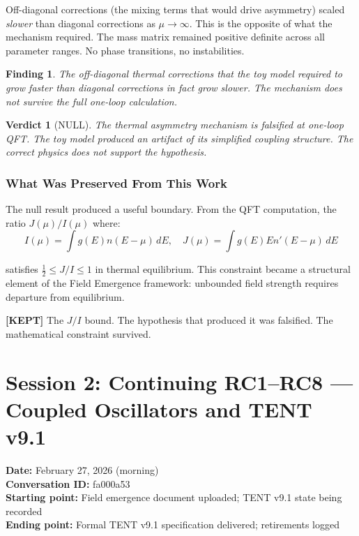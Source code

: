 \documentclass[11pt]{article}
\newtheorem{finding}{Finding}
\newtheorem{verdict}{Verdict}
\begin{document}
Off-diagonal corrections (the mixing terms that would drive asymmetry) scaled \textit{slower} than diagonal corrections as $\mu \to \infty$. This is the opposite of what the mechanism required. The mass matrix remained positive definite across all parameter ranges. No phase transitions, no instabilities.

\begin{finding}
The off-diagonal thermal corrections that the toy model required to grow faster than diagonal corrections in fact grow slower. The mechanism does not survive the full one-loop calculation.
\end{finding}

\begin{verdict}[\textcolor{nullred}{NULL}]
The thermal asymmetry mechanism is falsified at one-loop QFT. The toy model produced an artifact of its simplified coupling structure. The correct physics does not support the hypothesis.
\end{verdict}

\subsubsection{What Was Preserved From This Work}

The null result produced a useful boundary. From the QFT computation, the ratio $J(\mu)/I(\mu)$ where:
\begin{equation}
  I(\mu) = \int g(E) n(E - \mu)\, dE, \quad J(\mu) = \int g(E) E n'(E - \mu)\, dE
\end{equation}

satisfies $\frac{1}{2} \leq J/I \leq 1$ in thermal equilibrium. This constraint became a structural element of the Field Emergence framework: unbounded field strength requires departure from equilibrium.

\begin{graybox}
\textcolor{keepgreen}{\textbf{[KEPT]}} The $J/I$ bound. The hypothesis that produced it was falsified. The mathematical constraint survived.
\end{graybox}

\section{Session 2: Continuing RC1--RC8 --- Coupled Oscillators and TENT v9.1}
\label{sec:session2}

\textbf{Date:} February 27, 2026 (morning)\\
\textbf{Conversation ID:} fa000a53\\
\textbf{Starting point:} Field emergence document uploaded; TENT v9.1 state being recorded\\
\textbf{Ending point:} Formal TENT v9.1 specification delivered; retirements logged
\end{document}
